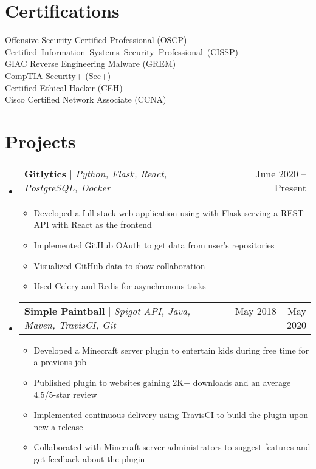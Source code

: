 \documentclass[letterpaper,11pt]{article}
\makeatletter
\newcommand{\resumeItem}[1]{
  \item\small{
    {#1 \vspace{-2pt}}
  }
}
\newcommand{\resumeProjectHeading}[2]{
    \item
    \begin{tabular*}{0.97\textwidth}{l@{\extracolsep{\fill}}r}
      \small#1 & #2 \\
    \end{tabular*}\vspace{-7pt}
}
\newcommand{\resumeSubHeadingListStart}{\begin{itemize}[leftmargin=0.15in, label={}]}
\newcommand{\resumeSubHeadingListEnd}{\end{itemize}}
\newcommand{\resumeItemListStart}{\begin{itemize}}
\newcommand{\resumeItemListEnd}{\end{itemize}\vspace{-5pt}}
\makeatother
\begin{document}
\section{\textbf{Certifications}}
\vspace{-5mm}
\setlength{\columnsep}{50pt}
\begin{multicols}{2}
    \begin{itemize}[noitemsep]
        \small{\item[] {Offensive Security Certified Professional (OSCP) \\ 
            \mbox{Certified Information Systems Security Professional (CISSP)} \\
            GIAC Reverse Engineering Malware (GREM) \\
            CompTIA Security+ (Sec+) \\ 
            Certified Ethical Hacker (CEH) \\
            Cisco Certified Network Associate (CCNA)
        }}
    \end{itemize}
\end{multicols}

\section{\textbf{Projects}}
    \resumeSubHeadingListStart
      \resumeProjectHeading
          {\textbf{Gitlytics} $|$ \emph{Python, Flask, React, PostgreSQL, Docker}}{June 2020 -- Present}
          \resumeItemListStart
            \resumeItem{Developed a full-stack web application using with Flask serving a REST API with React as the frontend}
            \resumeItem{Implemented GitHub OAuth to get data from user’s repositories}
            \resumeItem{Visualized GitHub data to show collaboration}
            \resumeItem{Used Celery and Redis for asynchronous tasks}
          \resumeItemListEnd
      \resumeProjectHeading
          {\textbf{Simple Paintball} $|$ \emph{Spigot API, Java, Maven, TravisCI, Git}}{May 2018 -- May 2020}
          \resumeItemListStart
            \resumeItem{Developed a Minecraft server plugin to entertain kids during free time for a previous job}
            \resumeItem{Published plugin to websites gaining 2K+ downloads and an average 4.5/5-star review}
            \resumeItem{Implemented continuous delivery using TravisCI to build the plugin upon new a release}
            \resumeItem{Collaborated with Minecraft server administrators to suggest features and get feedback about the plugin}
          \resumeItemListEnd
    \resumeSubHeadingListEnd
\end{document}

